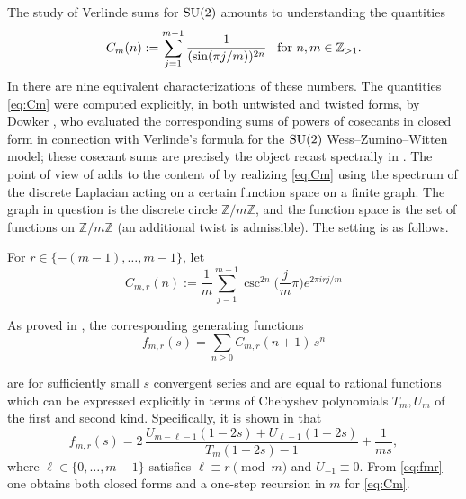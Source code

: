 \documentclass[11pt,reqno]{amsart}
\theoremstyle{remark}
\begin{document}
The study of Verlinde sums for $\text{\rm SU}(2)$ amounts to understanding the quantities
\begin{equation}
\label{eq:Cm}
C_m(n) := \sum_{j=1}^{m-1} \frac{1}{(\sin(\pi j/m))^{2n}}
\,\,\,\,\,
\text{\rm for $n,m\in\mathbb Z_{>1}$.}
\end{equation}
In \cite{Zagier} there are nine equivalent characterizations of these
numbers. The quantities \eqref{eq:Cm} were computed explicitly, in both untwisted and
twisted forms, by Dowker \cite{Dowker92}, who evaluated the corresponding sums
of powers of cosecants in closed form in connection with Verlinde's formula for
the $\text{\rm SU}(2)$ Wess--Zumino--Witten model; these cosecant sums are
precisely the object recast spectrally in \cite{JKS-cosecant}. The point of view of \cite{JKS-cosecant} adds to the content
of \cite{Dowker92, Zagier} by realizing \eqref{eq:Cm} using the spectrum of the discrete
Laplacian acting on a certain function space on a finite graph.
The graph in question is the discrete circle $\mathbb Z/m\mathbb Z$, and the function space
is the set of functions on $\mathbb Z/m\mathbb Z$ (an additional twist is admissible).
The setting is as follows.

For $r\in\{-(m-1),\dots,m-1\}$, let
\begin{equation}\label{eq:csc-sums}
C_{m,r}(n) := \frac1m\sum_{j=1}^{m-1}\csc^{2n}\!\Big(\frac{j}{m}\pi\Big)e^{2\pi i r j/m}
\end{equation}

As proved in \cite{JKS-cosecant}, the corresponding generating functions
$$
f_{m,r}(s) = \sum_{n\ge0} C_{m,r}(n+1)\,s^n
$$

are for sufficiently small $s$ convergent series and are equal to rational functions which can be expressed explicitly
in terms of Chebyshev polynomials $T_m,U_m$ of the first and second kind.  Specifically,
it is shown in \cite{JKS-cosecant} that
\begin{equation}
\label{eq:fmr}
f_{m,r}(s) = 2\,\frac{U_{m-\ell-1}(1-2s)+U_{\ell-1}(1-2s)}{T_m(1-2s)-1} + \frac{1}{ms},
\end{equation}
where $\ell\in\{0,\dots,m-1\}$ satisfies $\ell\equiv r\pmod m$ and
$U_{-1}\equiv0$. From %
\eqref{eq:fmr} one obtains both
closed forms and a one-step recursion in $m$ for \eqref{eq:Cm}.
\end{document}
